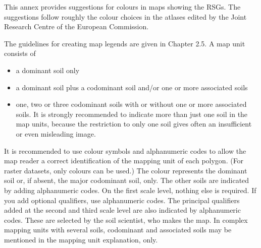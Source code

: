 \documentclass[
  letterpaper,
  DIV=11,
  numbers=noendperiod]{scrreprt}
\providecommand{\tightlist}{%
  \setlength{\itemsep}{0pt}\setlength{\parskip}{0pt}}\usepackage{longtable,booktabs,array}
\begin{document}
This annex provides suggestions for colours in maps showing the RSGs.
The suggestions follow roughly the colour choices in the atlases edited
by the Joint Research Centre of the European Commission.

The guidelines for creating map legends are given in Chapter 2.5. A map
unit consists of

\begin{itemize}
\tightlist
\item
  a dominant soil only
\item
  a dominant soil plus a codominant soil and/or one or more associated
  soils
\item
  one, two or three codominant soils with or without one or more
  associated soils. It is strongly recommended to indicate more than
  just one soil in the map units, because the restriction to only one
  soil gives often an insufficient or even misleading image.
\end{itemize}

It is recommended to use colour symbols and alphanumeric codes to allow
the map reader a correct identification of the mapping unit of each
polygon. (For raster datasets, only colours can be used.) The colour
represents the dominant soil or, if absent, the major codominant soil,
only. The other soils are indicated by adding alphanumeric codes. On the
first scale level, nothing else is required. If you add optional
qualifiers, use alphanumeric codes. The principal qualifiers added at
the second and third scale level are also indicated by alphanumeric
codes. These are selected by the soil scientist, who makes the map. In
complex mapping units with several soils, codominant and associated
soils may be mentioned in the mapping unit explanation, only.
\end{document}
